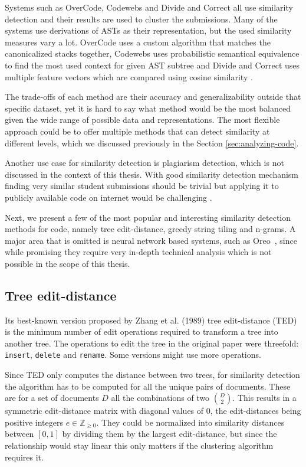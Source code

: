 Systems such as OverCode, Codewebs and Divide and Correct all use similarity detection and their results are used to cluster the submissions. Many of the systems use derivations of ASTs as their representation, but the used similarity measures vary a lot. OverCode uses a custom algorithm that matches the canonicalized stacks together, Codewebs uses probabilistic semantical equivalence to find the most used context for given AST subtree and Divide and Correct uses multiple feature vectors which are compared using cosine similarity \cite{overcode,codewebs,divide-and-correct}.

The trade-offs of each method are their accuracy and generalizability outside that specific dataset, yet it is hard to say what method would be the most balanced given the wide range of possible data and representations. The most flexible approach could be to offer multiple methods that can detect similarity at different levels, which we discussed previously in the Section \ref{sec:analyzing-code}.

Another use case for similarity detection is plagiarism detection, which is not discussed in the context of this thesis. With good similarity detection mechanism finding very similar student submissions should be trivial but applying it to publicly available code on internet would be challenging \cite{simon-better-ngrams-2020}.

Next, we present a few of the most popular and interesting similarity detection methods for code, namely tree edit-distance, greedy string tiling and n-grams. A major area that is omitted is neural network based systems, such as Oreo~\cite{oreo}, since while promising they require very in-depth technical analysis which is not possible in the scope of this thesis.

\subsection{Tree edit-distance}
\label{ssec:ted}

Its best-known version proposed by Zhang et al. (1989) \cite{zhang-et-al-1989} tree edit-distance (TED) is the minimum number of edit operations required to transform a tree into another tree. The operations to edit the tree in the original paper were threefold: \texttt{insert}, \texttt{delete} and \texttt{rename}. Some versions might use more operations.

Since TED only computes the distance between two trees, for similarity detection the algorithm has to be computed for all the unique pairs of documents. These are for a set of documents $D$ all the combinations of two $\binom{D}{2}$. This results in a symmetric edit-distance matrix with diagonal values of 0, the edit-distances being positive integers $e \in \mathbb Z_{\ge 0}$. They could be normalized into similarity distances between $[0, 1]$ by dividing them by the largest edit-distance, but since the relationship would stay linear this only matters if the clustering algorithm requires it.


